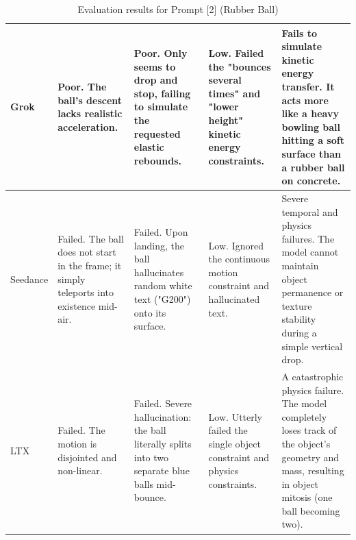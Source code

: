 \documentclass[sigconf]{acmart}
\begin{document}
\begin{table}[t]
\begin{tabularx}{\textwidth}{| l | >{\raggedright\arraybackslash}X | >{\raggedright\arraybackslash}X | >{\raggedright\arraybackslash}X | >{\raggedright\arraybackslash}X |}
        Grok           & Poor. The ball's descent lacks realistic acceleration.                                      & Poor. Only seems to drop and stop, failing to simulate the requested elastic rebounds.                   & Low. Failed the "bounces several times" and "lower height" kinetic energy constraints.     & Fails to simulate kinetic energy transfer. It acts more like a heavy bowling ball hitting a soft surface than a rubber ball on concrete.                       \\ \hline
        Seedance       & Failed. The ball does not start in the frame; it simply teleports into existence mid-air.   & Failed. Upon landing, the ball hallucinates random white text ("G200") onto its surface.                 & Low. Ignored the continuous motion constraint and hallucinated text.                       & Severe temporal and physics failures. The model cannot maintain object permanence or texture stability during a simple vertical drop.                          \\ \hline
        LTX            & Failed. The motion is disjointed and non-linear.                                            & Failed. Severe hallucination: the ball literally splits into two separate blue balls mid-bounce.         & Low. Utterly failed the single object constraint and physics constraints.                  & A catastrophic physics failure. The model completely loses track of the object's geometry and mass, resulting in object mitosis (one ball becoming two).       \\ \hline
    \end{tabularx}
    \caption{Evaluation results for Prompt [2] (Rubber Ball)}
    \label{tab:eval_prompt_2}
\end{table}
\end{document}
